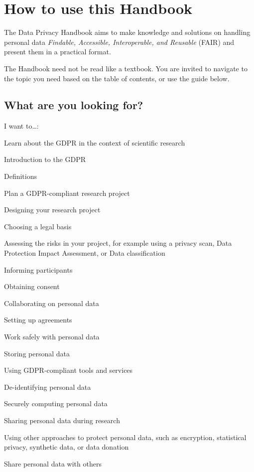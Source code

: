 \documentclass[
]{book}
\begin{document}
\hypertarget{how-to-use-this-handbook}{%
\section{How to use this Handbook}\label{how-to-use-this-handbook}}

The Data Privacy Handbook aims to make knowledge and solutions on handling personal
data \emph{Findable, Accessible, Interoperable, and Reusable} (FAIR) and present them in
a practical format.

The Handbook need not be read like a textbook. You are invited to navigate to the
topic you need based on the table of contents, or use the guide below.

\hypertarget{what-are-you-looking-for}{%
\subsection{What are you looking for?}\label{what-are-you-looking-for}}

I want to\ldots:

Learn about the GDPR in the context of scientific research

Introduction to the GDPR

Definitions

Plan a GDPR-compliant research project

Designing your research project

Choosing a legal basis

Assessing the risks in your project,
for example using a privacy scan,
Data Protection Impact Assessment, or
Data classification

Informing participants

Obtaining consent

Collaborating on personal data

Setting up agreements

Work safely with personal data

Storing personal data

Using GDPR-compliant tools and services

De-identifying personal data

Securely computing personal data

Sharing personal data during research

Using other approaches to protect personal data, such as
encryption,
statistical privacy,
synthetic data, or
data donation

Share personal data with others
\end{document}
